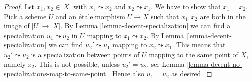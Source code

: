 \documentclass{stacks-project}
\theoremstyle{plain}
\theoremstyle{definition}
\theoremstyle{remark}
\numberwithin{equation}{subsection}
\begin{document}
\begin{proof}
Let $x_1, x_2 \in |X|$ with $x_1 \leadsto x_2$ and $x_2 \leadsto x_1$.
We have to show that $x_1 = x_2$. Pick a scheme $U$ and an \'etale morphism
$U \to X$ such that $x_1, x_2$ are both in the image of $|U| \to |X|$.
By Lemma \ref{lemma-decent-specialization} we can find a specialization
$u_1 \leadsto u_2$ in $U$ mapping to $x_1 \leadsto x_2$.
By Lemma \ref{lemma-decent-specialization} we can find
$u_2' \leadsto u_1$ mapping to $x_2 \leadsto x_1$. This means that
$u_2' \leadsto u_2$ is a specialization between points of $U$ mapping to
the same point of $X$, namely $x_2$. This is not possible, unless
$u_2' = u_2$, see
Lemma \ref{lemma-decent-no-specializations-map-to-same-point}. Hence
also $u_1 = u_2$ as desired.
\end{proof}
\end{document}
